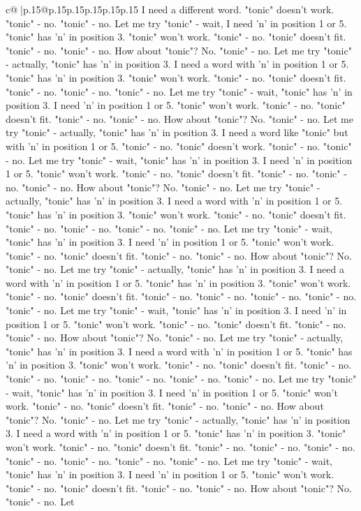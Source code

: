 \documentclass{article}
\begin{document}
{\begin{supertabular}{c@{$\;$}|p{.15\linewidth}@{}p{.15\linewidth}p{.15\linewidth}p{.15\linewidth}p{.15\linewidth}p{.15\linewidth}}
{{{I need a different word. "tonic" doesn't work. "tonic" {-} no. "tonic" {-} no. Let me try "tonic" {-} wait, I need 'n' in position 1 or 5. "tonic" has 'n' in position 3. "tonic" won't work. "tonic" {-} no. "tonic" doesn't fit. "tonic" {-} no. "tonic" {-} no. How about "tonic"? No. "tonic" {-} no. Let me try "tonic" {-} actually, "tonic" has 'n' in position 3. I need a word with 'n' in position 1 or 5. "tonic" has 'n' in position 3. "tonic" won't work. "tonic" {-} no. "tonic" doesn't fit. "tonic" {-} no. "tonic" {-} no. "tonic" {-} no. Let me try "tonic" {-} wait, "tonic" has 'n' in position 3. I need 'n' in position 1 or 5. "tonic" won't work. "tonic" {-} no. "tonic" doesn't fit. "tonic" {-} no. "tonic" {-} no. How about "tonic"? No. "tonic" {-} no. Let me try "tonic" {-} actually, "tonic" has 'n' in position 3. I need a word like "tonic" but with 'n' in position 1 or 5. "tonic" {-} no. "tonic" doesn't work. "tonic" {-} no. "tonic" {-} no. Let me try "tonic" {-} wait, "tonic" has 'n' in position 3. I need 'n' in position 1 or 5. "tonic" won't work. "tonic" {-} no. "tonic" doesn't fit. "tonic" {-} no. "tonic" {-} no. "tonic" {-} no. How about "tonic"? No. "tonic" {-} no. Let me try "tonic" {-} actually, "tonic" has 'n' in position 3. I need a word with 'n' in position 1 or 5. "tonic" has 'n' in position 3. "tonic" won't work. "tonic" {-} no. "tonic" doesn't fit. "tonic" {-} no. "tonic" {-} no. "tonic" {-} no. "tonic" {-} no. Let me try "tonic" {-} wait, "tonic" has 'n' in position 3. I need 'n' in position 1 or 5. "tonic" won't work. "tonic" {-} no. "tonic" doesn't fit. "tonic" {-} no. "tonic" {-} no. How about "tonic"? No. "tonic" {-} no. Let me try "tonic" {-} actually, "tonic" has 'n' in position 3. I need a word with 'n' in position 1 or 5. "tonic" has 'n' in position 3. "tonic" won't work. "tonic" {-} no. "tonic" doesn't fit. "tonic" {-} no. "tonic" {-} no. "tonic" {-} no. "tonic" {-} no. "tonic" {-} no. Let me try "tonic" {-} wait, "tonic" has 'n' in position 3. I need 'n' in position 1 or 5. "tonic" won't work. "tonic" {-} no. "tonic" doesn't fit. "tonic" {-} no. "tonic" {-} no. How about "tonic"? No. "tonic" {-} no. Let me try "tonic" {-} actually, "tonic" has 'n' in position 3. I need a word with 'n' in position 1 or 5. "tonic" has 'n' in position 3. "tonic" won't work. "tonic" {-} no. "tonic" doesn't fit. "tonic" {-} no. "tonic" {-} no. "tonic" {-} no. "tonic" {-} no. "tonic" {-} no. "tonic" {-} no. Let me try "tonic" {-} wait, "tonic" has 'n' in position 3. I need 'n' in position 1 or 5. "tonic" won't work. "tonic" {-} no. "tonic" doesn't fit. "tonic" {-} no. "tonic" {-} no. How about "tonic"? No. "tonic" {-} no. Let me try "tonic" {-} actually, "tonic" has 'n' in position 3. I need a word with 'n' in position 1 or 5. "tonic" has 'n' in position 3. "tonic" won't work. "tonic" {-} no. "tonic" doesn't fit. "tonic" {-} no. "tonic" {-} no. "tonic" {-} no. "tonic" {-} no. "tonic" {-} no. "tonic" {-} no. "tonic" {-} no. Let me try "tonic" {-} wait, "tonic" has 'n' in position 3. I need 'n' in position 1 or 5. "tonic" won't work. "tonic" {-} no. "tonic" doesn't fit. "tonic" {-} no. "tonic" {-} no. How about "tonic"? No. "tonic" {-} no. Let }}}
\end{supertabular}}
\end{document}
